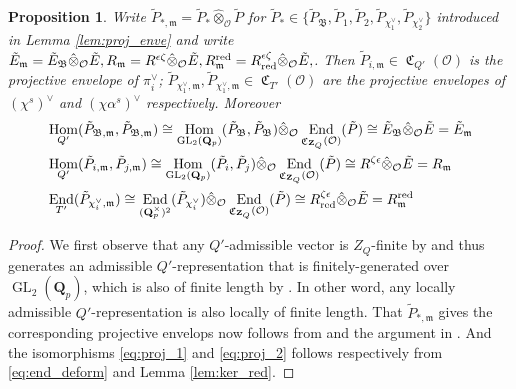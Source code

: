 \documentclass[leqno]{amsart}
\newtheorem{prop}[thm]{Proposition}
\theoremstyle{definition}
\theoremstyle{remark}
\newcommand{\oo}{\mathcal{O}}
\newcommand{\Z}{{\mathbf{Z}}}
\newcommand{\Qp}{\mathbf{Q}_p}
\DeclareMathOperator{\End}{End}
\DeclareMathOperator{\Hom}{Hom}
\DeclareMathOperator{\GL}{GL}
\newcommand{\fm}{\mathfrak{m}}
\DeclareMathOperator{\fC}{\mathfrak{C}} %
\newcommand{\B}{\mathfrak B} %
\newcommand{\red}{\textnormal{red}}
\begin{document}
\begin{prop}\label{prop:envelope}
    Write $\tilde{P}_{*,\fm}=
    \tilde{P}_*\hat{\otimes}_{\oo}\tilde{P}$
    for $\tilde{P}_*\in\{\tilde{P}_\B, \tilde{P}_1, \tilde{P}_2,
    \tilde{P}_{\chi_1^\vee}, \tilde{P}_{\chi_2^\vee}\}$
    introduced in Lemma \ref{lem:proj_enve}
	and write 
    $\tilde{E}_{\fm}=\tilde{E}_\B
	\hat{\otimes}_{\oo}\tilde{E},
    R_{\fm}=R^{\epsilon\zeta}
	\hat{\otimes}_{\oo}\tilde{E},
    R_{\fm}^\red=R^{\epsilon\zeta}_\red
	\hat{\otimes}_{\oo}\tilde{E},$.
	Then $\tilde{P}_{i,\fm}\in \fC_{Q'}(\oo)$
	is the projective envelope of $\pi_i^\vee$;
	$\tilde{P}_{\chi_1^\vee,\fm}, \tilde{P}_{\chi_1^\vee,\fm}
    \in \fC_{T'}(\oo)$ are the projective envelopes
	of $(\chi^s)^\vee$ and
    $(\chi\alpha^s)^\vee$ respectively.
    Moreover
    \begin{align}\label{eq:proj_0}
    &\Hom_{Q'}(\tilde{P}_{\B,\fm}, \tilde{P}_{\B,\fm}) \cong 
    \Hom_{\GL_2(\Qp)}(\tilde{P}_\B, \tilde{P}_\B)
    \hat{\otimes}_\oo \End_{\fC_{\Z_Q}(\oo)}(\tilde{P})\cong 
    \tilde{E}_\B \hat{\otimes}_\oo \tilde{E}
    = \tilde{E}_\fm\\\label{eq:proj_1}
    &\Hom_{Q'}(\tilde{P}_{i,\fm}, \tilde{P}_{j,\fm}) \cong 
    \Hom_{\GL_2(\Qp)}(\tilde{P}_{i}, \tilde{P}_{j})
    \hat{\otimes}_\oo \End_{\fC_{\Z_Q}(\oo)}(\tilde{P})\cong 
    R^{\zeta\epsilon} \hat{\otimes}_\oo \tilde{E}
    = R_\fm\\\label{eq:proj_2}
    &\End_{T'}(\tilde{P}_{\chi_i^\vee,\fm}) \cong 
    \End_{(\Qp^\times)^2}(\tilde{P}_{\chi_i^\vee})
    \hat{\otimes}_\oo \End_{\fC_{\Z_Q}(\oo)}(\tilde{P})\cong 
    R^{\zeta\epsilon}_\red \hat{\otimes}_\oo \tilde{E}
    =R_\fm^{\red}
    \end{align}
\end{prop}
\begin{proof}
    We first observe that any $Q'$-admissible vector 
	is $Z_Q$-finite by \cite[Lem 2.3.5]{emeI}
    and thus generates an admissible $Q'$-representation
    that is finitely-generated over $\GL_2(\Qp)$,
	which is also of finite length by \cite[Thm 2.3.8]{emeI}.
	In other word,
	any locally admissible $Q'$-representation 
	is also locally of finite length.
    That $\tilde{P}_{*,\fm}$ gives
    the corresponding projective envelops now follows from 
    \cite[Lem B.6]{GN}
	and the argument in \cite[Lem B.8]{GN}.
    And the isomorphisms 
    \eqref{eq:proj_1} and
    \eqref{eq:proj_2} follows respectively from  
    \eqref{eq:end_deform} and 
    Lemma \eqref{lem:ker_red}.
\end{proof}
\end{document}
